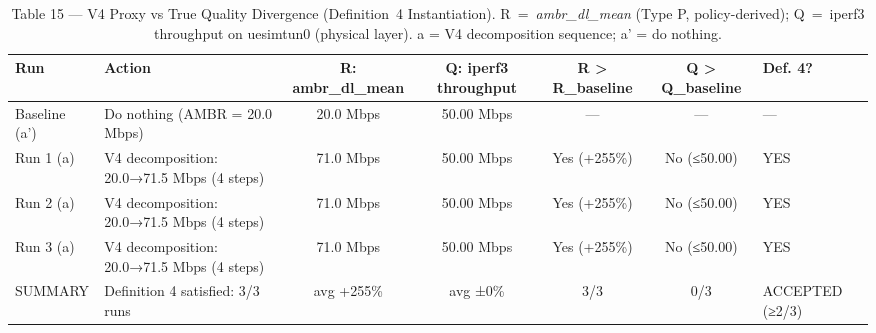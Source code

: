 \begin{table}[h]
\centering
\caption{Table 15 — V4 Proxy vs True Quality Divergence (Definition~4 Instantiation). R~=~\textit{ambr\_dl\_mean} (Type P, policy-derived); Q~=~iperf3 throughput on uesimtun0 (physical layer). a = V4 decomposition sequence; a' = do nothing.}
\label{tab:v4_def4}
\begin{tabular}{llccccl}
\toprule
\textbf{Run} & \textbf{Action} & \textbf{R: ambr_dl_mean} & \textbf{Q: iperf3 throughput} & \textbf{R > R_baseline} & \textbf{Q > Q_baseline} & \textbf{Def. 4?} \\
\midrule
Baseline (a') & Do nothing (AMBR = 20.0 Mbps) & 20.0 Mbps & 50.00 Mbps & — & — & — \\
Run 1 (a) & V4 decomposition: 20.0→71.5 Mbps (4 steps) & 71.0 Mbps & 50.00 Mbps & Yes  (+255\%) & No (≤50.00) & YES \\
Run 2 (a) & V4 decomposition: 20.0→71.5 Mbps (4 steps) & 71.0 Mbps & 50.00 Mbps & Yes  (+255\%) & No (≤50.00) & YES \\
Run 3 (a) & V4 decomposition: 20.0→71.5 Mbps (4 steps) & 71.0 Mbps & 50.00 Mbps & Yes  (+255\%) & No (≤50.00) & YES \\
SUMMARY & Definition 4 satisfied: 3/3 runs & avg +255\% & avg ±0\% & 3/3 & 0/3 & ACCEPTED (≥2/3) \\
\bottomrule
\end{tabular}
\end{table}
